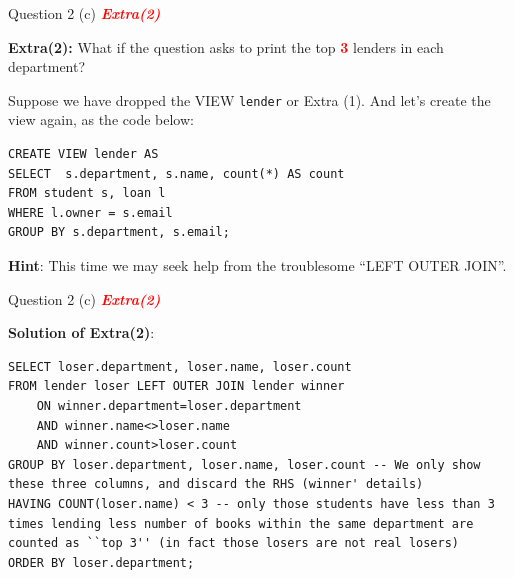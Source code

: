 \begin{frame}[fragile]{Question 2 (c) \textcolor{red}{\textit{\textbf{Extra(2)}}}}
	
\textbf{Extra(2):} What if the question asks to print the top \textcolor{red}{\textbf{3}} lenders in each department? \\\vspace{5pt}

Suppose we have dropped the VIEW \texttt{lender} or Extra (1).
And let's create the view again, as the code below:

\begin{lstlisting}[style=sql-small]
CREATE VIEW lender AS
SELECT  s.department, s.name, count(*) AS count
FROM student s, loan l
WHERE l.owner = s.email
GROUP BY s.department, s.email;
\end{lstlisting}\vspace{3pt}


\textbf{Hint}: This time we may seek help from the troublesome ``LEFT OUTER JOIN''.
\end{frame}

\begin{frame}[fragile]{Question 2 (c) \textcolor{red}{\textit{\textbf{Extra(2)}}}}
	
\textbf{Solution of Extra(2)}:
\begin{lstlisting}
SELECT loser.department, loser.name, loser.count 
FROM lender loser LEFT OUTER JOIN lender winner
	ON winner.department=loser.department 
	AND winner.name<>loser.name 
	AND winner.count>loser.count
GROUP BY loser.department, loser.name, loser.count -- We only show these three columns, and discard the RHS (winner' details) 
HAVING COUNT(loser.name) < 3 -- only those students have less than 3 times lending less number of books within the same department are counted as ``top 3'' (in fact those losers are not real losers)
ORDER BY loser.department;
\end{lstlisting}
  
\end{frame}

